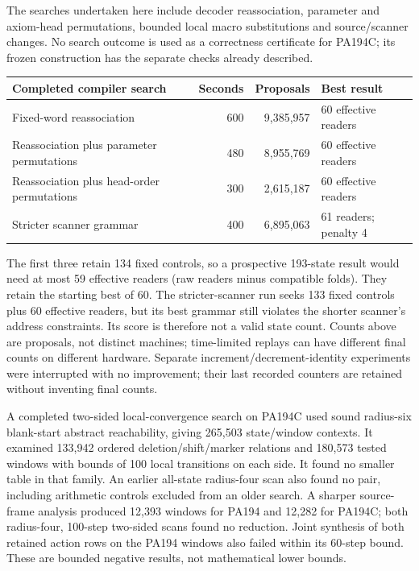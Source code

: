 The searches undertaken here include decoder reassociation, parameter and
axiom-head permutations, bounded local macro substitutions and source/scanner
changes. No search outcome is used as a correctness certificate for PA194C;
its frozen construction has the separate checks already described.

\begin{center}\small
\begin{tabularx}{\linewidth}{@{}Xrrl@{}}
\toprule
Completed compiler search & Seconds & Proposals & Best result\\
\midrule
Fixed-word reassociation &600&9,385,957&60 effective readers\\
Reassociation plus parameter permutations &480&8,955,769&60 effective readers\\
Reassociation plus head-order permutations &300&2,615,187&60 effective readers\\
Stricter scanner grammar &400&6,895,063&61 readers; penalty 4\\
\bottomrule
\end{tabularx}
\end{center}

The first three retain 134 fixed controls, so a prospective 193-state result
would need at most 59 effective readers (raw readers minus compatible folds).
They retain the starting best of 60. The stricter-scanner run seeks 133 fixed
controls plus 60 effective readers, but its best grammar still violates the
shorter scanner's address constraints. Its score is therefore not a valid
state count. Counts above are proposals, not distinct machines; time-limited
replays can have different final counts on different hardware. Separate
increment/decrement-identity experiments were interrupted with no improvement;
their last recorded counters are retained without inventing final counts.

A completed two-sided local-convergence search on PA194C used sound
radius-six blank-start abstract reachability, giving 265,503 state/window
contexts. It examined 133,942 ordered deletion/shift/marker relations and
180,573 tested windows with bounds of 100 local transitions on each side.
It found no smaller table in that family. An earlier all-state radius-four
scan also found no pair, including arithmetic controls excluded from an older
search. A sharper source-frame analysis produced 12,393 windows for PA194
and 12,282 for PA194C; both radius-four, 100-step two-sided scans found no
reduction. Joint synthesis of both retained action rows on the PA194 windows
also failed within its 60-step bound. These are bounded negative results,
not mathematical lower bounds.

